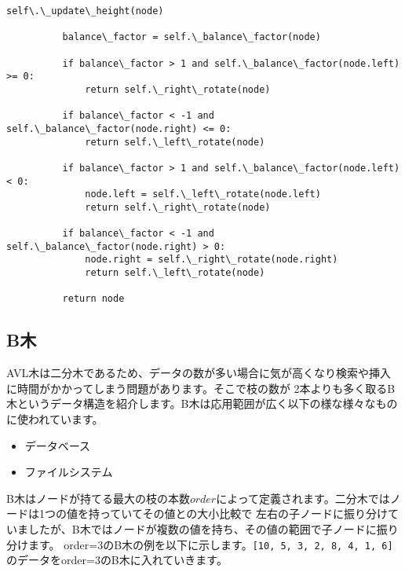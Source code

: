 \begin{lstlisting}[caption=二分ヒープの実装, label=binaryheap, frame=TRBL, label={binaryheap}]
          self\.\_update\_height(node)
          
          balance\_factor = self.\_balance\_factor(node)
          
          if balance\_factor > 1 and self.\_balance\_factor(node.left) >= 0:
              return self.\_right\_rotate(node)
          
          if balance\_factor < -1 and self.\_balance\_factor(node.right) <= 0:
              return self.\_left\_rotate(node)
          
          if balance\_factor > 1 and self.\_balance\_factor(node.left) < 0:
              node.left = self.\_left\_rotate(node.left)
              return self.\_right\_rotate(node)
          
          if balance\_factor < -1 and self.\_balance\_factor(node.right) > 0:
              node.right = self.\_right\_rotate(node.right)
              return self.\_left\_rotate(node)
          
          return node
  \end{lstlisting}

\newpage
\subsection{B木}
AVL木は二分木であるため、データの数が多い場合に気が高くなり検索や挿入に時間がかかってしまう問題があります。そこで枝の数が
2本よりも多く取るB木というデータ構造を紹介します。B木は応用範囲が広く以下の様な様々なものに使われています。

\begin{itemize}
  \item データベース
  \item ファイルシステム
\end{itemize}

B木はノードが持てる最大の枝の本数$order$によって定義されます。二分木ではノードは1つの値を持っていてその値との大小比較で
左右の子ノードに振り分けていましたが、B木ではノードが複数の値を持ち、その値の範囲で子ノードに振り分けます。
order=$3$のB木の例を以下に示します。\texttt{[10, 5, 3, 2, 8, 4, 1, 6]}
のデータをorder=$3$のB木に入れていきます。

\vspace{0.5cm}

\begin{center}
\end{center}


